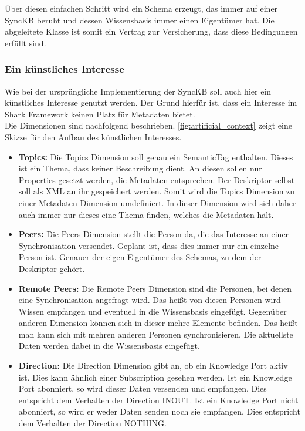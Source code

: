 \documentclass[a4paper]{article}
\begin{document}
	Über diesen einfachen Schritt wird ein Schema erzeugt, das immer auf einer
	SyncKB beruht und dessen Wissensbasis immer einen Eigentümer hat. Die
	abgeleitete Klasse ist somit ein Vertrag zur Versicherung, dass diese
	Bedingungen erfüllt sind.
	
	\subsubsection{Ein künstliches Interesse}
	\label{sec:artificial_interest}
	
	Wie bei der ursprüngliche Implementierung der SyncKB soll auch hier ein
	künstliches Interesse genutzt werden. Der Grund hierfür ist, dass ein
	Interesse im Shark Framework keinen Platz für Metadaten bietet. \\
	
	Die Dimensionen sind nachfolgend beschrieben. \autoref{fig:artificial_context}
	zeigt eine Skizze für den Aufbau des künstlichen Interesses.
	
	\begin{itemize}
		\item \textbf{Topics:} Die Topics Dimension soll genau ein SemanticTag
		enthalten. Dieses ist ein Thema, dass keiner Beschreibung
		dient. An diesen sollen nur Properties gesetzt werden, die Metadaten
		entsprechen. Der Deskriptor selbst soll als XML an ihr gespeichert werden.
		Somit wird die Topics Dimension zu einer Metadaten Dimension umdefiniert.
		In dieser Dimension wird sich daher auch immer nur dieses eine Thema finden,
		welches die Metadaten hält.
		\item \textbf{Peers:}  Die Peers Dimension stellt die Person da, die das
		Interesse an einer Synchronisation versendet. Geplant ist, dass dies
		immer nur ein einzelne Person ist. Genauer der eigen Eigentümer
		des Schemas, zu dem der Deskriptor gehört.
		\item \textbf{Remote Peers:} Die Remote Peers Dimension sind die Personen,
		bei denen eine Synchronisation angefragt wird. Das heißt von diesen
		Personen wird Wissen empfangen und eventuell in die Wissensbasis eingefügt.
		Gegenüber anderen Dimension können sich in dieser mehre Elemente befinden.
		Das heißt man kann sich mit mehren anderen Personen synchronisieren.
		Die aktuellste Daten werden dabei in die Wissensbasis eingefügt.
		\item \textbf{Direction:} Die Direction Dimension gibt an, ob ein 
		Knowledge Port aktiv ist. Dies kann ähnlich einer Subscription gesehen
		werden.	Ist ein Knowledge Port abonniert, so wird dieser Daten versenden 
		und	empfangen. Dies entspricht dem Verhalten der Direction INOUT. Ist ein
		Knowledge Port nicht abonniert, so wird er weder Daten senden noch sie
		empfangen. Dies entspricht dem Verhalten der Direction NOTHING.
	\end{itemize} 	
	
\end{document}
